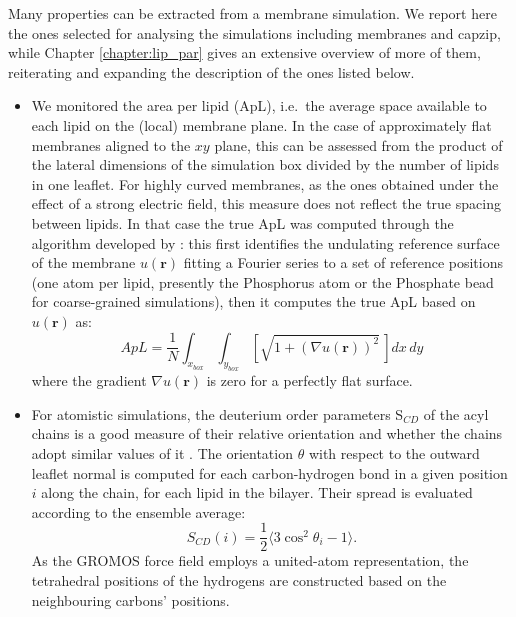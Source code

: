 Many properties can be extracted from a membrane simulation. We report here the ones selected for analysing the simulations including membranes and capzip, while Chapter \ref{chapter:lip_par} gives an extensive overview of more of them, reiterating and expanding the description of the ones listed below.

\begin{itemize}
\item We monitored the area per lipid (ApL), i.e.\ the average space available to each lipid on the (local) membrane plane. In the case of approximately flat membranes aligned to the $xy$ plane, this can be assessed from the product of the lateral dimensions of the simulation box divided by the number of lipids in one leaflet.
%
For highly curved membranes, as the ones obtained under the effect of a strong electric field, this measure does not reflect the true spacing between lipids. In that case the true ApL was computed through the algorithm developed by \citet{Braun2011}: this first identifies the undulating reference surface of the membrane $u(\textbf{r})$ fitting a Fourier series to a set of reference positions (one atom per lipid, presently the Phosphorus atom or the Phosphate bead for coarse-grained simulations), then it computes the true ApL based on $u(\textbf{r})$ as:
\begin{equation}
ApL = \frac{1}{N} \int_{x_{box}} \int_{y_{box}} \left[ \sqrt{1 + \left( \nabla u(\textbf{r}) \right)^2} \, \right] dx\,dy
\end{equation}
where the gradient $\nabla u(\textbf{r})$ is zero for a perfectly flat surface.

\item For atomistic simulations, the deuterium order parameters S$_{CD}$ of the acyl chains is a good measure of their relative orientation and whether the chains adopt similar values of it \citep{VanLehn2014a,Douliez1998,Piggot2017}. The orientation $\theta$ with respect to the outward leaflet normal is computed for each carbon-hydrogen bond in a given position $i$ along the chain, for each lipid in the bilayer. Their spread is evaluated according to the ensemble average:
\begin{equation}
S_{CD}(i) = \frac{1}{2} \langle 3\cos^2 \theta_i - 1 \rangle.
\end{equation}
As the GROMOS force field employs a united-atom representation, the tetrahedral positions of the hydrogens are constructed based on the neighbouring carbons’ positions.


\end{itemize}
